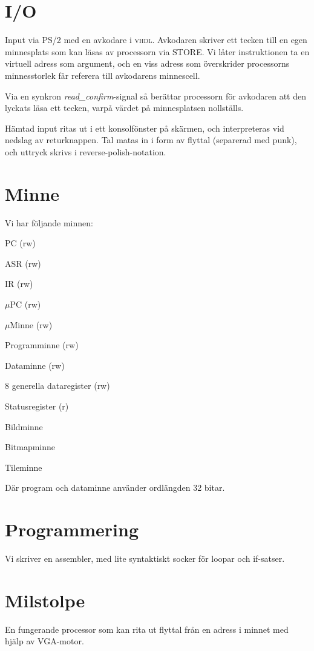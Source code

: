 \documentclass[]{article}
\begin{document}
\newpage

\section{I/O}
Input via PS/2 med en avkodare i \textsc{vhdl}. Avkodaren skriver ett tecken till en egen minnesplats som kan läsas av processorn via STORE. Vi låter instruktionen ta en virtuell adress som argument, och en viss adress som överskrider processorns minnesstorlek får referera till avkodarens minnescell.

Via en synkron \textit{read\_confirm}-signal så berättar processorn för avkodaren att den lyckats läsa ett tecken, varpå värdet på minnesplatsen nollställs.

Hämtad input ritas ut i ett konsolfönster på skärmen, och interpreteras vid nedslag av returknappen. Tal matas in i form av flyttal (separerad med punk), och uttryck skrivs i reverse-polish-notation.


\section{Minne}
Vi har följande minnen:
\begin{itemize*}
\item PC (rw)
\item ASR (rw)
\item IR (rw)
\item $\mu$PC (rw)
\item $\mu$Minne (rw)
\item Programminne (rw)
\item Dataminne (rw)
\item 8 generella dataregister (rw)
\item Statusregister (r)
\item Bildminne
\item Bitmapminne
\item Tileminne
\end{itemize*}
Där program och dataminne använder ordlängden 32 bitar.

\section{Programmering}
Vi skriver en assembler, med lite syntaktiskt socker för loopar och if-satser.

\section{Milstolpe}
En fungerande processor som kan rita ut flyttal från en adress i minnet med hjälp av VGA-motor.
\end{document}
